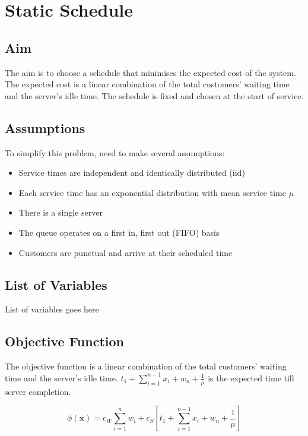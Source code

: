 \chapter{Static Schedule}

\section{Aim}

The aim is to choose a schedule that minimises the expected cost of the system. The expected cost is a linear combination of the total customers' waiting time and the server's idle time. The schedule is fixed and chosen at the start of service.

\section{Assumptions}

To simplify this problem, need to make several assumptions:

\begin{itemize}[nosep]
	\item Service times are independent and identically distributed (iid)
	\item Each service time has an exponential distribution with mean service time $\mu$
	\item There is a single server
	\item The queue operates on a first in, first out (FIFO) basis
	\item Customers are punctual and arrive at their scheduled time
\end{itemize}

\section{List of Variables}

List of variables goes here

\section{Objective Function}

The objective function is a linear combination of the total customers' waiting time and the server's idle time. $t_{1} + \sum_{i = 1}^{n - 1} x_{i} + w_{n} + \frac{1}{\mu}$ is the expected time till server completion.

\begin{equation}
	\phi (\mathbf{x}) = c_{W} \sum_{i = 1}^{n} w_{i} + c_{S} \left[ t_{1} + \sum_{i = 1}^{n - 1} x_{i} + w_{n} + \frac{1}{\mu} \right]
\end{equation}

